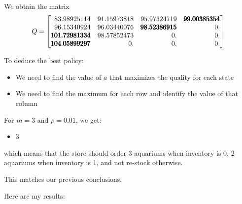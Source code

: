 \begin{solution}
\begin{slide}
\begin{parts}
	\item We obtain the matrix
	\[ 
	Q = \mat{
		83.98925114 & 91.15973818 & 95.97324719 & \pmb{99.00385354} \\
		96.15340924 & 96.03440076 & \pmb{98.52386915} &  0. \\
		\pmb{101.72981334} & 98.57852473 &  0.         &  0. \\
		\pmb{104.05899297} &  0.         &  0.         &  0.
	}
	\]
	
	\item To deduce the best policy:
	\begin{itemize}
		\item We need to find the value of $a$ that maximizes the quality for each state
		\item We need to find the maximum for each row and identify the value of that column
	\end{itemize} 
	
	For $m=3$ and $\rho=0.01$, we get:
	\begin{itemize}
		\item 3  \quad 0 
	\end{itemize}
	which means that the store should order 3 aquariums when inventory is 0, 2 aquariums when inventory is 1, and not re-stock otherwise.
	
	This matches our previous conclusions.
	
\end{parts}
\end{slide}

\begin{slide}
\begin{parts}
\setcounter{partsitem}{2}
	\item Here are my results:
\end{parts}
	

\end{slide}
\end{solution}
